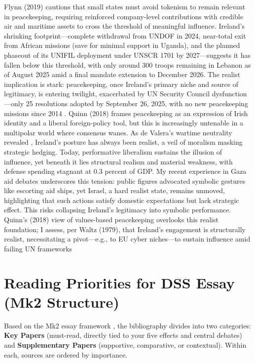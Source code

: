 Flynn (2019)\nocite{FLYNN_2019} cautions that small states must avoid tokenism to remain relevant in peacekeeping, requiring reinforced company-level contributions with credible air and maritime assets to cross the threshold of meaningful influence. Ireland’s shrinking footprint—complete withdrawal from UNDOF in 2024, near-total exit from African missions (save for minimal support in Uganda), and the planned phaseout of its UNIFIL deployment under UNSCR 1701 by 2027—suggests it has fallen below this threshold, with only around 300 troops remaining in Lebanon as of August 2025 amid a final mandate extension to December 2026. The realist implication is stark: peacekeeping, once Ireland’s primary niche and source of legitimacy, is entering twilight, exacerbated by UN Security Council dysfunction—only 25 resolutions adopted by September 26, 2025, with no new peacekeeping missions since 2014 \parencite{HELLMUELLER_2024}. Quinn (2018) \nocite{QUINN_2018} frames peacekeeping as an expression of Irish identity and a liberal foreign-policy tool, but this is increasingly untenable in a multipolar world where consensus wanes. As de Valera’s wartime neutrality revealed \parencite{FANNING_2015,AYIOTIS_2023}, Ireland’s posture has always been realist, a veil of moralism masking strategic hedging. Today, performative liberalism sustains the illusion of influence, yet beneath it lies structural realism and material weakness, with defense spending stagnant at 0.3 percent of GDP. My recent experience in Gaza aid debates underscores this tension: public figures advocated symbolic gestures like escorting aid ships, yet Israel, a hard realist state, remains unmoved, highlighting that such actions satisfy domestic expectations but lack strategic effect. This risks collapsing Ireland’s legitimacy into symbolic performance. Quinn’s (2018) view of values-based peacekeeping overlooks this realist foundation; I assess, per Waltz (1979), \nocite{WALTZ_1979}that Ireland’s engagement is structurally realist, necessitating a pivot—e.g., to EU cyber niches—to sustain influence amid failing UN frameworks


\section*{Reading Priorities for DSS Essay (Mk2 Structure)}

Based on the Mk2 essay framework \parencite{DSS_STRUCTURE_MK2}, the bibliography divides into two categories: 
\textbf{Key Papers} (must-read, directly tied to your five effects and central debates) and 
\textbf{Supplementary Papers} (supportive, comparative, or contextual). Within each, sources are ordered by importance.

